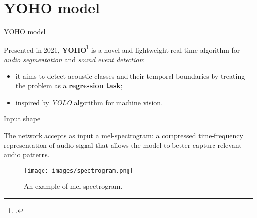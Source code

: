 

\section[YOHO model]{YOHO model}

	\begin{frame}{YOHO model}

		Presented in 2021, \textbf{YOHO}\footcite{Venkatesh_2022} is a novel and lightweight real-time algorithm for
		\textit{audio segmentation} and \textit{sound event detection}:

		\begin{itemize}
			\item {it aims to detect acoustic classes and their temporal boundaries by treating the problem as a
				\textbf{regression task};}
			\item inspired by \textit{YOLO} algorithm for machine vision.
		\end{itemize}

	\end{frame}

	\begin{frame}{Input shape}

		The network accepts as input a mel-spectrogram: a compressed time-frequency representation of audio signal that
		allows the model to better capture relevant audio patterns.

		\begin{figure}
			\centering
			\texttt{[image: images/spectrogram.png]}
			\caption{An example of mel-spectrogram.}
			\label{fig:spectogram}
		\end{figure}

	\end{frame}

